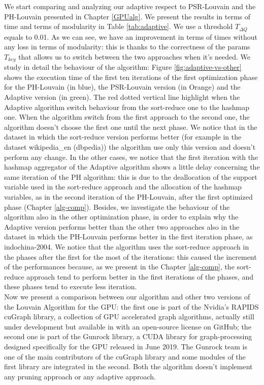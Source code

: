 We start comparing and analyzing our adaptive respect to PSR-Louvain and the PH-Louvain presented in Chapter \ref{GPUalg}. We present the results in terms of time and terms of modularity in Table \ref{tab:adaptive}. We use a threshold $T_{\Delta Q}$ equals to 0.01. As we can see, we have an improvement in terms of times without any loss in terms of modularity: this is thanks to the correctness of the params $T_{key}$ that allows us to switch between the two approaches when it's needed. 
We study in detail the behaviour of the algorithm: Figure \ref{fig:adaptive-vs-other} shows the execution time of the first ten iterations of the first optimization phase for the PH-Louvain (in blue), the PSR-Louvain version (in Orange) and the Adaptive version (in green). The red dotted vertical line highlight when the Adaptive algorithm switch behaviour from the sort-reduce one to the hashmap one. When the algorithm switch from the first approach to the second one, the algorithm doesn't choose the first one until the next phase. We notice that in the dataset in which the sort-reduce version performs better (for example in the dataset wikipedia\_en (dbpedia)) the algorithm use only this version and doesn't perform any change. In the other cases, we notice that the first iteration with the hashmap aggregator of the Adaptive algorithm shows a little delay concerning the same iteration of the PH algorithm: this is due to the deallocation of the support variable used in the sort-reduce approach and the allocation of the hashmap variables, as in the second iteration of the PH-Louvain, after the first optimized phase (Chapter \ref{alg-comp}). Besides, we investigate the behaviour of the algorithm also in the other optimization phase, in order to explain why the Adaptive version performs better than the other two approaches also in the dataset in which the PH-Louvain performs better in the first iteration phase, as indochina-2004. We notice that the algorithm uses the sort-reduce approach in the phases after the first for the most of the iterations: this caused the increment of the performances because, as we present in the Chapter \ref{alg-comp},  the sort-reduce approach tend to perform better in the first iterations of the phases, and these phases tend to execute less iteration.\\
Now we present a comparison between our algorithm and other two versions of the Louvain Algorithm for the GPU: the first one is part of the Nvidia's RAPIDS cuGraph library,  a collection of GPU accelerated graph algorithms, actually still under development but available in with an open-source license on GitHub; the second one is part of the Gunrock library, a CUDA  library for graph-processing designed specifically for the GPU released in June 2019. The Gunrock team is one of the main contributors of the cuGraph library and some modules of the first library are integrated in the second. Both the algorithm doesn't implement any pruning approach or any adaptive approach.

